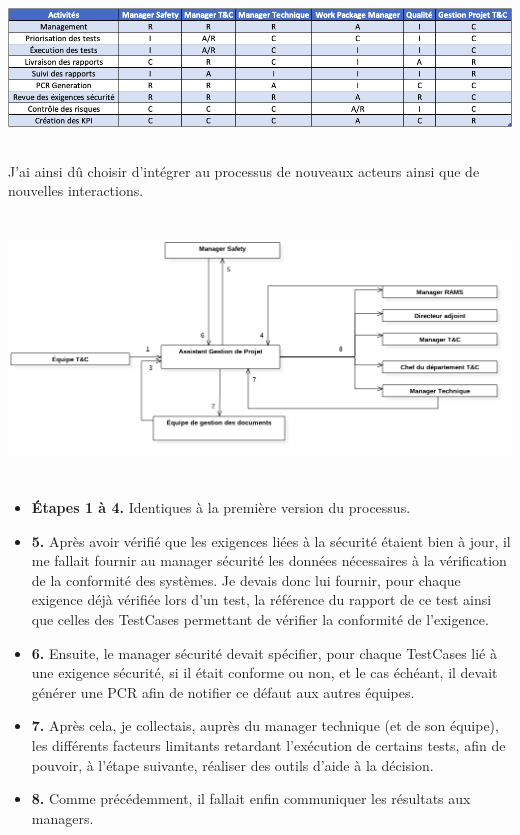 \begin{center}
\includegraphics[height=4cm]{ressources/images/figures/RACI.png}
\end{center}

J'ai ainsi dû choisir d'intégrer au processus de nouveaux acteurs ainsi que de nouvelles interactions.

\begin{center}
\includegraphics[height=7cm]{ressources/images/figures/Workflow2.png}
\end{center}


\begin{itemize}
\item \textbf{Étapes 1 à 4.} Identiques à la première version du processus.
\item \textbf{5.} Après avoir vérifié que les exigences liées à la sécurité étaient bien à jour, il me fallait fournir au manager sécurité les données nécessaires à la vérification de la conformité des systèmes. Je devais donc lui fournir, pour chaque exigence déjà vérifiée lors d'un test, la référence du rapport de ce test ainsi que celles des \gls{TestCases} permettant de vérifier la conformité de l'exigence.
\item \textbf{6.} Ensuite, le manager sécurité devait spécifier, pour chaque \gls{TestCases} lié à une exigence sécurité, si il était conforme ou non, et le cas échéant, il devait générer une \gls{PCR} afin de notifier ce défaut aux autres équipes.
\item \textbf{7.} Après cela, je collectais, auprès du manager technique (et de son équipe), les différents facteurs limitants retardant l'exécution de certains tests, afin de pouvoir, à l'étape suivante, réaliser des outils d'aide à la décision.
\item \textbf{8.} Comme précédemment, il fallait enfin communiquer les résultats aux managers.
\end{itemize}

